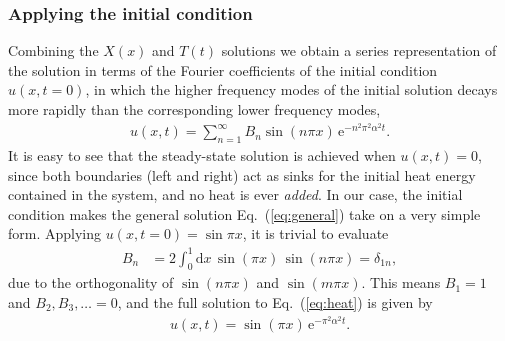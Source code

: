 \documentclass[a4paper, twocolumn]{article}
\newcommand{\eq} [1]{Eq.\ (\ref{eq:#1})}
\begin{document}
\subsubsection{Applying the initial condition}
Combining the $X(x)$ and $T(t)$ solutions we obtain a series representation of the solution in terms of the Fourier coefficients of the initial condition $u(x,t=0)$, in which the higher frequency modes of the initial solution decays more rapidly than the corresponding lower frequency modes,
\begin{align}
u(x,t) = \sum_{n=1}^\infty B_n \sin(n\pi x)\,\mathrm{e}^{-n^2\pi^2\alpha^2 t}. \label{eq:general}
\end{align}
It is easy to see that the steady-state solution is achieved when $u(x,t)=0$, since both boundaries (left and right) act as sinks for the initial heat energy contained in the system, and no heat is ever \textit{added}. In our case, the initial condition makes the general solution \eq{general} take on a very simple form. Applying $u(x,t=0)=\sin \pi x$, it is trivial to evaluate 
\begin{align}
B_n &= 2\int_0^1\mathrm{d}x\, \sin(\pi x)\, \sin(n\pi x) = \delta_{1n},
\end{align}
due to the orthogonality of $\sin(n\pi x)$ and $\sin(m\pi x)$. This means $B_1=1$ and $B_2,B_3,\dots = 0$,
and the full solution to \eq{heat} is given by 
\begin{align}
u(x,t)=\sin(\pi x)\,\mathrm{e}^{-\pi^2\alpha^2 t}. \label{eq:full}
\end{align}
\end{document}
